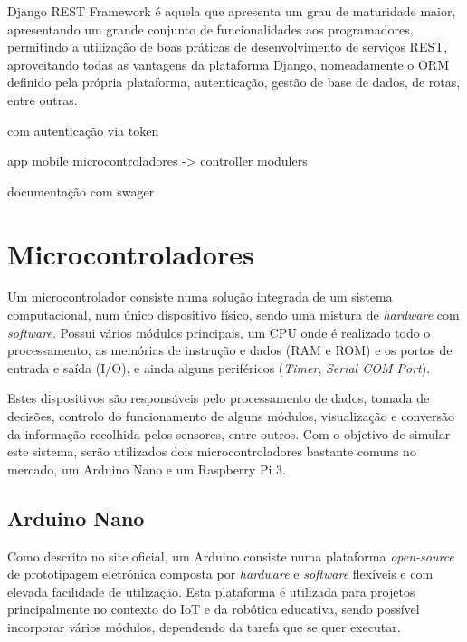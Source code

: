 Django REST Framework é aquela que
apresenta um grau de maturidade maior, apresentando um grande conjunto de funcionalidades
aos programadores, permitindo a utilização de boas práticas de desenvolvimento de serviços
REST, aproveitando todas as vantagens da plataforma Django, nomeadamente o ORM definido
pela própria plataforma, autenticação, gestão de base de dados, de rotas, entre outras.



com autenticação via token 







app mobile
microcontroladores -> controller modulers 


documentação com swager 



\newpage
\section{Microcontroladores}


Um microcontrolador consiste numa solução integrada de um sistema computacional, num único dispositivo físico, sendo uma mistura de \textit{hardware} com \textit{software}. Possui vários módulos principais, um \ac{CPU} onde é realizado todo o processamento, as memórias de instrução e dados (\ac{RAM} e \ac{ROM}) e os portos de entrada e saída (\ac{I/O}), e ainda alguns periféricos (\textit{Timer}, \textit{Serial COM Port}). 

Estes dispositivos são responsáveis pelo processamento de dados, tomada de decisões, controlo do funcionamento de alguns módulos, visualização e conversão da informação recolhida pelos sensores, entre outros. Com o objetivo de simular este sistema, serão utilizados dois microcontroladores bastante comuns no mercado, um Arduino Nano e um Raspberry Pi 3.  


\subsection{Arduino Nano}


Como descrito no site oficial, um Arduino consiste numa plataforma \textit{open-source} de prototipagem eletrónica composta por \textit{hardware} e \textit{software} flexíveis e com elevada facilidade de utilização. Esta plataforma é utilizada para projetos principalmente no contexto do \ac{IoT} e da robótica educativa, sendo possível incorporar vários módulos, dependendo da tarefa que se quer executar\cite{Banzi2012}. 

